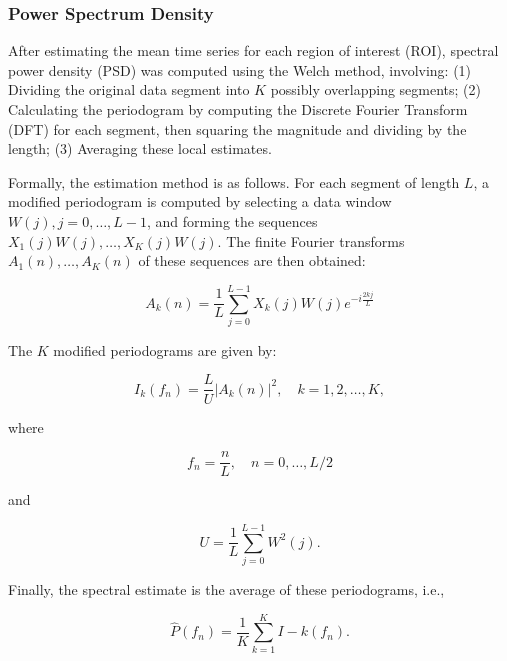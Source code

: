 \documentclass{cys}
\begin{document}
\subsubsection{Power Spectrum Density}
\smallskip
\noindent After estimating the mean time series for each region of interest (ROI), spectral power density (PSD) was computed using the Welch method, involving: (1) Dividing the original data segment into $K$ possibly overlapping segments; (2) Calculating the periodogram by computing the Discrete Fourier Transform (DFT) for each segment, then squaring the magnitude and dividing by the length; (3) Averaging these local estimates.

\bigskip
Formally, the estimation method is as follows. For each segment of length $L$, a modified periodogram is computed by selecting a data window $W(j), j = 0,\ldots , L-1$, and forming the sequences $X_1(j)W(j),\ldots , X_K(j)W(j)$. The finite Fourier transforms $A_1(n),\ldots , A_K(n)$ of these sequences are then obtained:

\begin{equation}
A_k(n) = \frac{1}{L} \sum_{j=0}^{L-1}X_k(j)W(j)e^{-i{\frac{2kj}{L}}}
\end{equation} 


\smallskip
The $K$ modified periodograms are given by:

\begin{equation}
I_k(f_n)=\frac{L}{U}|A_k(n)|^2, \quad k=1,2,\ldots,K,
\end{equation} 

where

\begin{equation*}
f_n=\frac{n}{L}, \quad n=0,\ldots,L/2
\end{equation*}

and

\begin{equation*}
U=\frac{1}{L}\sum_{j=0}^{L-1} W^2(j).
\end{equation*}

\smallskip
Finally, the spectral estimate is the average of these periodograms, i.e., 


\begin{equation}
\hat{P}(f_n)=\frac{1}{K}\sum_{k=1}^K I-k(f_n).
\end{equation}


\end{document}
